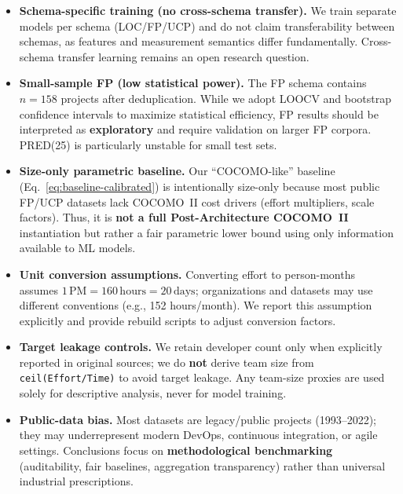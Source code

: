\documentclass{ieeeaccess}
\begin{document}
\begin{itemize}[leftmargin=1.4em]
  \item \textbf{Schema-specific training (no cross-schema transfer).} We train separate models per schema (LOC/FP/UCP) and do not claim transferability between schemas, as features and measurement semantics differ fundamentally. Cross-schema transfer learning remains an open research question.
  
  \item \textbf{Small-sample FP (low statistical power).} The FP schema contains $n=158$ projects after deduplication. While we adopt LOOCV and bootstrap confidence intervals to maximize statistical efficiency, FP results should be interpreted as \textbf{exploratory} and require validation on larger FP corpora. PRED(25) is particularly unstable for small test sets.
  
  \item \textbf{Size-only parametric baseline.} Our ``COCOMO-like'' baseline (Eq.~\ref{eq:baseline-calibrated}) is intentionally size-only because most public FP/UCP datasets lack COCOMO~II cost drivers (effort multipliers, scale factors). Thus, it is \textbf{not a full Post-Architecture COCOMO~II} instantiation but rather a fair parametric lower bound using only information available to ML models.
  
  \item \textbf{Unit conversion assumptions.} Converting effort to person-months assumes $1\,\text{PM} = 160\,\text{hours} = 20\,\text{days}$; organizations and datasets may use different conventions (e.g., 152 hours/month). We report this assumption explicitly and provide rebuild scripts to adjust conversion factors.
  
  \item \textbf{Target leakage controls.} We retain developer count only when explicitly reported in original sources; we do \textbf{not} derive team size from \texttt{ceil(Effort/Time)} to avoid target leakage. Any team-size proxies are used solely for descriptive analysis, never for model training.
  
  \item \textbf{Public-data bias.} Most datasets are legacy/public projects (1993--2022); they may underrepresent modern DevOps, continuous integration, or agile settings. Conclusions focus on \textbf{methodological benchmarking} (auditability, fair baselines, aggregation transparency) rather than universal industrial prescriptions.
\end{itemize}
\end{document}
